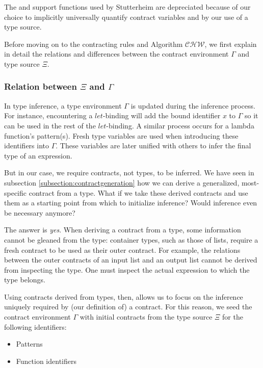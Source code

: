 \documentclass[10pt]{report}
\newcommand{\CHW}{$\mathcal{CHW}$}
\newcommand{\code}[1]{%
  {%
   \setlength{\fboxsep}{-2\fboxrule}%
   \fcolorbox{black}{light-gray}{\hspace{1.5pt}\strut\texttt{#1}\hspace{1.5pt}}%
  }%
}
\begin{document}
The \code{gen} and \code{inst} support functions used by Stutterheim are depreciated because of our choice to implicitly universally quantify contract variables and by our use of a type source.

Before moving on to the contracting rules and Algorithm \CHW, we first explain in detail the relations and differences between the contract environment $\Gamma$ and type source $\Xi$.

\subsubsection{Relation between $\Xi$ and $\Gamma$}

In type inference, a type environment $\Gamma$ is updated during the inference process.
For instance, encountering a $let$-binding will add the bound identifier $x$ to $\Gamma$ so it can be used in the rest of the $let$-binding.
A similar process occurs for a lambda function's pattern(s).
Fresh type variables are used when introducing these identifiers into $\Gamma$.
These variables are later unified with others to infer the final type of an expression.

But in our case, we require contracts, not types, to be inferred.
We have seen in subsection \ref{subsection:contractgeneration} how we can derive a generalized, most-specific contract from a type.
What if we take these derived contracts and use them as a starting point from which to initialize inference?
Would inference even be necessary anymore?

The answer is \textit{yes}.
When deriving a contract from a type, some information cannot be gleaned from the type: container types, such as those of lists, require a fresh contract to be used as their outer contract.
For example, the relations between the outer contracts of an input list and an output list cannot be derived from inspecting the type.
One must inspect the actual expression to which the type belongs.

Using contracts derived from types, then, allows us to focus on the inference uniquely required by (our definition of) a contract.
For this reason, we seed the contract environment $\Gamma$ with initial contracts from the type source $\Xi$ for the following identifiers:

\begin{itemize}
	\item Patterns
	\item Function identifiers
\end{itemize}
\end{document}
